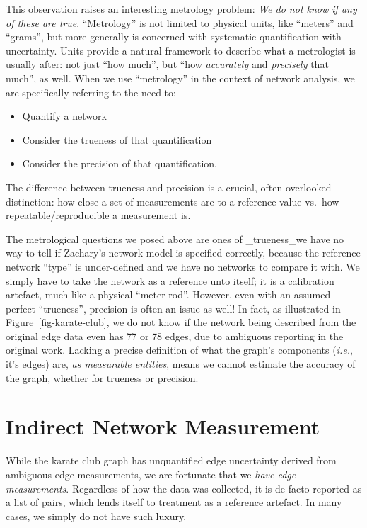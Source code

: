 \documentclass[%
	12pt,
		oneside,
		letterpaper
]{book}
\providecommand{\tightlist}{%
  \setlength{\itemsep}{0pt}\setlength{\parskip}{0pt}}\usepackage{longtable,booktabs,array}
\begin{document}
This observation raises an interesting metrology problem: \emph{We do not know if any of these are true}.
``Metrology'' is not limited to physical units, like ``meters'' and ``grams'', but more generally is concerned with systematic quantification with uncertainty.
Units provide a natural framework to describe what a metrologist is usually after: not just ``how much'', but ``how \emph{accurately} and \emph{precisely} that much'', as well.
When we use ``metrology'' in the context of network analysis, we are specifically referring to the need to:

\begin{itemize}
\tightlist
\item
  Quantify a network
\item
  Consider the trueness of that quantification
\item
  Consider the precision of that quantification.
\end{itemize}

The difference between trueness and precision is a crucial, often overlooked distinction: how close a set of measurements are to a reference value vs.~how repeatable/reproducible a measurement is\autocite{Accuracytruenessprecision_ISO1994}.

The metrological questions we posed above are ones of \_trueness\_we have no way to tell if Zachary's network model is specified correctly, because the reference network ``type'' is under-defined and we have no networks to compare it with.
We simply have to take the network as a reference unto itself; it is a calibration artefact, much like a physical ``meter rod''.
However, even with an assumed perfect ``trueness'', precision is often an issue as well!
In fact, as illustrated in Figure~\ref{fig-karate-club}, we do not know if the network being described from the original edge data even has 77 or 78 edges, due to ambiguous reporting in the original work.
Lacking a precise definition of what the graph's components (\emph{i.e.}, it's edges) are, \emph{as measurable entities}, means we cannot estimate the accuracy of the graph, whether for trueness or precision.

\section{Indirect Network Measurement}\label{indirect-network-measurement}

While the karate club graph has unquantified edge uncertainty derived from ambiguous edge measurements, we are fortunate that we \emph{have edge measurements}.
Regardless of how the data was collected, it is de facto reported as a list of pairs, which lends itself to treatment as a reference artefact.
In many cases, we simply do not have such luxury.
\end{document}
